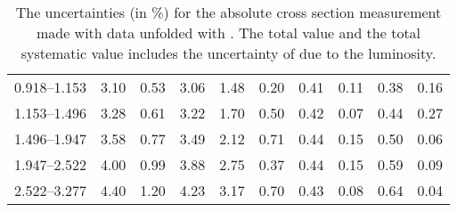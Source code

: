 \begin{table}
\begin{center}
\begin{tabular}{@{}l l l l l l l l l l@{}}
            0.918--1.153     &  3.10   &  0.53   &  3.06         &  1.48      &  0.20    &  0.41  &  0.11       &  0.38  &  0.16  \\
            1.153--1.496     &  3.28   &  0.61   &  3.22         &  1.70      &  0.50    &  0.42  &  0.07       &  0.44  &  0.27  \\
            1.496--1.947     &  3.58   &  0.77   &  3.49         &  2.12      &  0.71    &  0.44  &  0.15       &  0.50  &  0.06  \\
            1.947--2.522     &  4.00   &  0.99   &  3.88         &  2.75      &  0.37    &  0.44  &  0.15       &  0.59  &  0.09  \\
            2.522--3.277     &  4.40   &  1.20   &  4.23         &  3.17      &  0.70    &  0.43  &  0.08       &  0.64  &  0.04  \\
            \bottomrule
        \end{tabular}
    \end{center}
    \caption[
        The uncertainties for the absolute cross section measurement made with
        data unfolded with \POWHEG.
    ]{
        The uncertainties (in \%) for the absolute cross section measurement
        made with data unfolded with \POWHEG. The total value and the total
        systematic value includes the uncertainty of \LumiUncertainty due to
        the luminosity.
    }
    \label{tab:sys_uncert_abs_powheg}
\end{table}
